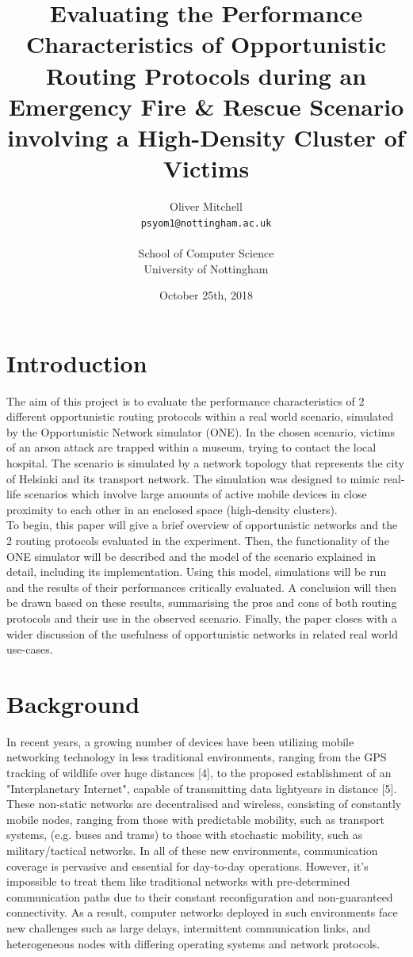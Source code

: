 \documentclass{article}
\title{Evaluating the Performance Characteristics of Opportunistic Routing Protocols during an Emergency Fire \& Rescue Scenario involving a High-Density Cluster of Victims}
\author{
  Oliver Mitchell\\
  \texttt{psyom1@nottingham.ac.uk}\\\\
  \textnormal{School of Computer Science}\\
  \textnormal{University of Nottingham}
}
\date{October 25th, 2018}
\begin{document}
\maketitle
 
\tableofcontents
\newpage

\section{Introduction}
The aim of this project is to evaluate the performance characteristics of 2 different opportunistic routing protocols within a real world scenario, simulated by the Opportunistic Network simulator (ONE). In the chosen scenario, victims of an arson attack are trapped within a museum, trying to contact the local hospital. The scenario is simulated by a network topology that represents the city of Helsinki and its transport network. The simulation was designed to mimic real-life scenarios which involve large amounts of active mobile devices in close proximity to each other in an enclosed space (high-density clusters).\\
\newline
To begin, this paper will give a brief overview of opportunistic networks and the 2 routing protocols evaluated in the experiment. Then, the functionality of the ONE simulator will be described and the model of the scenario explained in detail, including its implementation. Using this model, simulations will be run and the results of their performances critically evaluated. A conclusion will then be drawn based on these results, summarising the pros and cons of both routing protocols and their use in the observed scenario. Finally, the paper closes with a wider discussion of the usefulness of opportunistic networks in related real world use-cases.

\section{Background}
In recent years, a growing number of devices have been utilizing mobile networking technology in less traditional environments, ranging from the GPS tracking of wildlife over huge distances [4], to the proposed establishment of an "Interplanetary Internet", capable of transmitting data lightyears in distance [5]. These non-static networks are decentralised and wireless, consisting of constantly mobile nodes, ranging from those with predictable mobility, such as transport systems, (e.g. buses and trams) to those with stochastic mobility, such as military/tactical networks. In all of these new environments, communication coverage is pervasive and essential for day-to-day operations. However, it's impossible to treat them like traditional networks with pre-determined communication paths due to their constant reconfiguration and non-guaranteed connectivity. As a result, computer networks deployed in such environments face new challenges such as large delays, intermittent communication links, and heterogeneous nodes with differing operating systems and network protocols.
\end{document}
